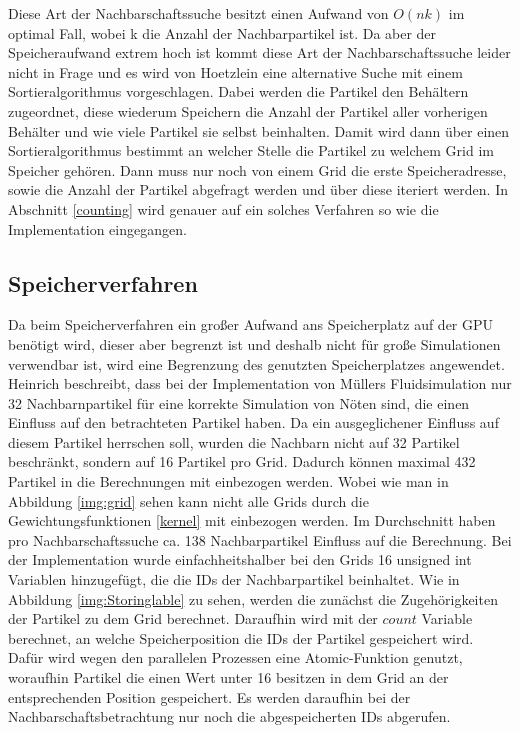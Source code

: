 \documentclass[intern,palatino]{cgBA}
\begin{document}
Diese Art der Nachbarschaftssuche besitzt einen Aufwand von $O(n k)$ im optimal Fall, wobei k die Anzahl der Nachbarpartikel ist. Da aber der Speicheraufwand extrem hoch ist kommt diese Art der Nachbarschaftssuche leider nicht in Frage und es wird von Hoetzlein \cite{nvidia} eine alternative Suche mit einem Sortieralgorithmus vorgeschlagen.
\newline
Dabei werden die Partikel den Behältern zugeordnet, diese wiederum Speichern die Anzahl der Partikel aller vorherigen Behälter und wie viele Partikel sie selbst beinhalten. Damit wird dann über einen Sortieralgorithmus bestimmt an welcher Stelle die Partikel zu welchem Grid im Speicher gehören. Dann muss nur noch von einem Grid die erste Speicheradresse, sowie die Anzahl der Partikel abgefragt werden und über diese iteriert werden.
\newline
In Abschnitt \ref{counting} wird genauer auf ein solches Verfahren so wie die Implementation eingegangen.


\subsection{Speicherverfahren}\label{speicher}

Da beim Speicherverfahren ein großer Aufwand ans Speicherplatz auf der GPU benötigt wird, dieser aber begrenzt ist und deshalb nicht für große Simulationen verwendbar ist, wird eine Begrenzung des genutzten Speicherplatzes angewendet. Heinrich \cite{nvidia2} beschreibt, dass bei der Implementation von Müllers \cite{muller2003particle} Fluidsimulation nur 32 Nachbarnpartikel für eine korrekte Simulation von Nöten sind, die einen Einfluss auf den betrachteten Partikel haben. Da ein ausgeglichener Einfluss auf diesem Partikel herrschen soll, wurden die Nachbarn nicht auf 32 Partikel beschränkt, sondern auf 16 Partikel pro Grid. Dadurch können maximal 432 Partikel in die Berechnungen mit einbezogen werden. Wobei wie man in Abbildung \ref{img:grid} sehen kann nicht alle Grids durch die Gewichtungsfunktionen \ref{kernel} mit einbezogen werden. Im Durchschnitt haben pro Nachbarschaftssuche ca. 138 Nachbarpartikel Einfluss auf die Berechnung.
\newline
Bei der Implementation wurde einfachheitshalber bei den Grids 16 unsigned int Variablen hinzugefügt, die die IDs der Nachbarpartikel beinhaltet.
\newline
Wie in Abbildung \ref{img:Storinglable} zu sehen, werden die zunächst die Zugehörigkeiten der Partikel zu dem Grid berechnet. Daraufhin wird mit der $count$ Variable berechnet, an welche Speicherposition die IDs der Partikel gespeichert wird. Dafür wird wegen den parallelen Prozessen eine Atomic-Funktion genutzt, woraufhin Partikel die einen Wert unter 16 besitzen in dem Grid an der entsprechenden Position gespeichert. Es werden daraufhin bei der Nachbarschaftsbetrachtung nur noch die abgespeicherten IDs abgerufen. 
\end{document}
